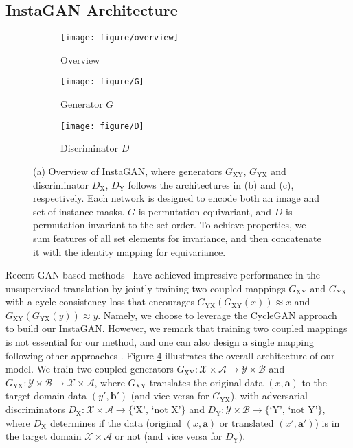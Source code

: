 \documentclass{article} \usepackage{iclr2019_conference,times}
\begin{document}
\vspace{-0.05in}
\subsection{InstaGAN Architecture}
\label{sec:method-architecture}
\vspace{-0.05in}

\begin{figure}[t]
\vspace{-0.2in}
\centering
\begin{subfigure}{.26\textwidth}
	\centering
	\texttt{[image: figure/overview]}
	\caption{Overview}\label{fig:architecturea}
\end{subfigure}
\begin{subfigure}{.38\textwidth}
	\centering
	\texttt{[image: figure/G]}
	\caption{Generator $G$}\label{fig:architectureb}
\end{subfigure}
\begin{subfigure}{.34\textwidth}
	\centering
	\texttt{[image: figure/D]}
	\caption{Discriminator $D$}\label{fig:architecturec}
\end{subfigure}
\caption{
(a) Overview of InstaGAN,
where generators $G_\textrm{XY}$, $G_\textrm{YX}$ and discriminator $D_\textrm{X}$, $D_\textrm{Y}$ follows the architectures in (b) and (c), respectively.
Each network is designed to encode both an image and set of instance masks.
$G$ is permutation equivariant, and $D$ is permutation invariant to the set order.
To achieve properties,
we sum features of all set elements for invariance, 
and then concatenate it with the identity mapping for equivariance. 
} \label{fig:architecture}
\vspace{-0.1in}
\end{figure}

Recent GAN-based methods~\citep{zhu2017unpaired, liu2017unsupervised} have achieved impressive performance in the unsupervised translation by jointly training two coupled mappings $G_\textrm{XY}$ and $G_\textrm{YX}$ with a cycle-consistency loss that encourages $G_\textrm{YX}(G_\textrm{XY}(x)) \approx x$ and $G_\textrm{XY}(G_\textrm{YX}(y)) \approx y$.
Namely, we choose to leverage the CycleGAN approach~\citep{zhu2017unpaired} to build our InstaGAN.
However, we remark that training two coupled mappings is not essential for our method,
and one can also design a single mapping following other approaches \citep{benaim2017one, galanti2018role}.
Figure \ref{fig:architecture} illustrates the overall architecture of our model.
We train two coupled generators $G_\textrm{XY}: \mathcal{X} \times \mathcal{A} \to \mathcal{Y} \times \mathcal{B}$
and $G_\textrm{YX}: \mathcal{Y} \times \mathcal{B} \to \mathcal{X} \times \mathcal{A}$,
where $G_\textrm{XY}$ translates the original data $(x,\bm{a})$ to
the target domain data $(y',\bm{b'})$ (and vice versa for $G_\textrm{YX}$),
with adversarial discriminators $D_\textrm{X}:\mathcal{X} \times \mathcal{A} \to \{\mbox{`X', `not X'}\}$
and $D_\textrm{Y}:\mathcal{Y} \times \mathcal{B} \to \{\mbox{`Y', `not Y'}\}$,
where $D_\textrm{X}$ determines if the data (original $(x,\bm{a})$ or translated $(x',\bm{a}')$)
is in the target domain $\mathcal{X} \times \mathcal{A}$ or not (and vice versa for $D_\textrm{Y}$).
\end{document}
